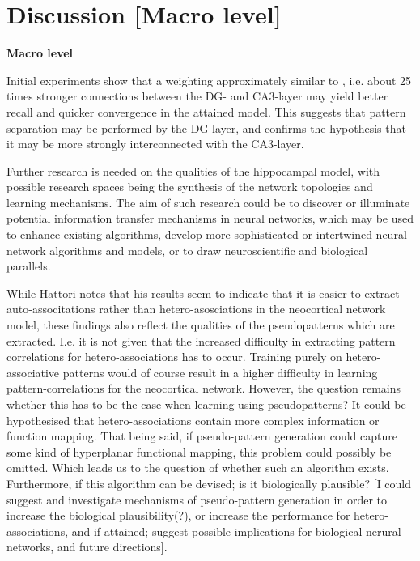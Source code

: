 
\chapter{Discussion [Macro level]}\label{chpt:discussion}
\textbf{Macro level}

Initial experiments show that a weighting approximately similar to \citep{Wakagi2008}, i.e. about 25 times stronger connections between the DG- and CA3-layer may yield better recall and quicker convergence in the attained model. This suggests that pattern separation may be performed by the DG-layer, and confirms the hypothesis that it may be more strongly interconnected with the CA3-layer.

Further research is needed on the qualities of the hippocampal model, with possible research spaces being the synthesis of the network topologies and learning mechanisms. The aim of such research could be to discover or illuminate potential information transfer mechanisms in neural networks, which may be used to enhance existing algorithms, develop more sophisticated or intertwined neural network algorithms and models, or to draw neuroscientific and biological parallels.


While Hattori notes that his results seem to indicate that it is easier to extract auto-associtations rather than hetero-asosciations in the neocortical network model, these findings also reflect the qualities of the pseudopatterns which are extracted. I.e. it is not given that the increased difficulty in extracting pattern correlations for hetero-associations has to occur. Training purely on hetero-associative patterns would of course result in a higher difficulty in learning pattern-correlations for the neocortical network. However, the question remains whether this has to be the case when learning using pseudopatterns? It could be hypothesised that hetero-associations contain more complex information or function mapping. That being said, if pseudo-pattern generation could capture some kind of hyperplanar functional mapping, this problem could possibly be omitted. Which leads us to the question of whether such an algorithm exists. Furthermore, if this algorithm can be devised; is it biologically plausible? [I could suggest and investigate mechanisms of pseudo-pattern generation in order to increase the biological plausibility(?), or increase the performance for hetero-associations, and if attained; suggest possible implications for biological nerural networks, and future directions].

